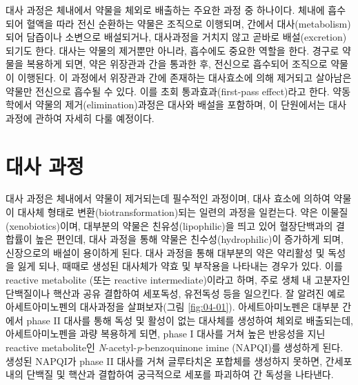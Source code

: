 \documentclass[
  11pt,
  krantz2, a4paper, twoside]{krantz}
\begin{document}
대사 과정은 체내에서 약물을 체외로 배출하는 주요한 과정 중 하나이다. 체내에 흡수되어 혈액을 따라 전신 순환하는 약물은 조직으로 이행되며, 간에서 대사(metabolism)되어 담즙이나 소변으로 배설되거나, 대사과정을 거치지 않고 곧바로 배설(excretion)되기도 한다. 대사는 약물의 제거뿐만 아니라, 흡수에도 중요한 역할을 한다. 경구로 약물을 복용하게 되면, 약은 위장관과 간을 통과한 후, 전신으로 흡수되어 조직으로 약물이 이행된다. 이 과정에서 위장관과 간에 존재하는 대사효소에 의해 제거되고 살아남은 약물만 전신으로 흡수될 수 있다. 이를 초회 통과효과(first-pass effect)라고 한다. 약동학에서 약물의 제거(elimination)과정은 대사와 배설을 포함하며, 이 단원에서는 대사 과정에 관하여 자세히 다룰 예정이다.

\hypertarget{uxb300uxc0ac-uxacfcuxc815}{%
\section{대사 과정}\label{uxb300uxc0ac-uxacfcuxc815}}

대사 과정은 체내에서 약물이 제거되는데 필수적인 과정이며, 대사 효소에 의하여 약물이 대사체 형태로 변환(biotransformation)되는 일련의 과정을 일컫는다. 약은 이물질(xenobiotics)이며, 대부분의 약물은 친유성(lipophilic)을 띄고 있어 혈장단백과의 결합률이 높은 편인데, 대사 과정을 통해 약물은 친수성(hydrophilic)이 증가하게 되며, 신장으로의 배설이 용이하게 된다. 대사 과정을 통해 대부분의 약은 약리활성 및 독성을 잃게 되나, 때때로 생성된 대사체가 약효 및 부작용을 나타내는 경우가 있다. 이를 reactive metabolite (또는 reactive intermediate)이라고 하며, 주로 생체 내 고분자인 단백질이나 핵산과 공유 결합하여 세포독성, 유전독성 등을 일으킨다. 잘 알려진 예로 아세트아미노펜의 대사과정을 살펴보자(그림 \ref{fig:04-01}). 아세트아미노펜은 대부분 간에서 phase II 대사를 통해 독성 및 활성이 없는 대사체를 생성하여 체외로 배출되는데, 아세트아미노펜을 과량 복용하게 되면, phase I 대사를 거쳐 높은 반응성을 지닌 reactive metabolite인 \emph{N}-acetyl-\emph{p}-benzoquinone imine (NAPQI)를 생성하게 된다. 생성된 NAPQI가 phase II 대사를 거쳐 글루타치온 포합체를 생성하지 못하면, 간세포 내의 단백질 및 핵산과 결합하여 궁극적으로 세포를 파괴하여 간 독성을 나타낸다.
\end{document}
